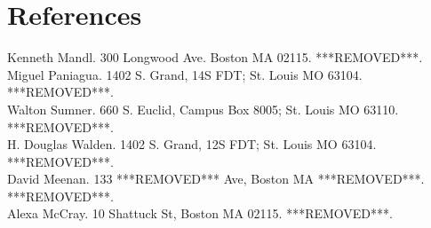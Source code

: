 \documentclass[11pt]{article}
\begin{document}
\section{References}
Kenneth Mandl. 300 Longwood Ave. Boston MA 02115. ***REMOVED***.\\
Miguel Paniagua. 1402 S. Grand, 14S FDT; St. Louis MO 63104.
***REMOVED***.\\
Walton Sumner. 660 S. Euclid, Campus Box 8005; St. Louis MO 63110.
***REMOVED***.\\
H. Douglas Walden. 1402 S. Grand, 12S FDT; St. Louis MO 63104.
***REMOVED***.\\
David Meenan. 133 ***REMOVED*** Ave, Boston MA ***REMOVED***. ***REMOVED***.\\
Alexa McCray. 10 Shattuck St, Boston MA 02115. ***REMOVED***.\\
\end{document}
